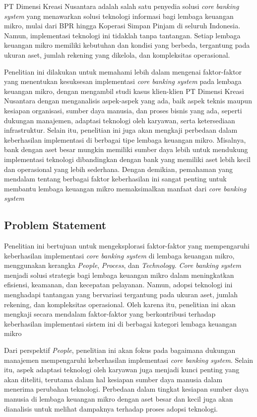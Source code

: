 \documentclass[journal,article,submit,pdftex,moreauthors]{Definitions/mdpi}
\begin{document}
PT Dimensi Kreasi Nusantara adalah salah satu penyedia solusi \textit{core banking system} yang menawarkan solusi teknologi informasi bagi lembaga keuangan mikro, mulai dari BPR hingga Koperasi Simpan Pinjam di seluruh Indonesia. Namun, implementasi teknologi ini tidaklah tanpa tantangan. Setiap lembaga keuangan mikro memiliki kebutuhan dan kondisi yang berbeda, tergantung pada ukuran aset, jumlah rekening yang dikelola, dan kompleksitas operasional.

Penelitian ini dilakukan untuk memahami lebih dalam mengenai faktor-faktor yang menentukan kesuksesan implementasi \textit{core banking system} pada lembaga keuangan mikro, dengan mengambil studi kasus klien-klien PT Dimensi Kreasi Nusantara dengan menganalisis aspek-aspek yang ada, baik aspek teknis maupun kesiapan organisasi, sumber daya manusia, dan proses bisnis yang ada, seperti dukungan manajemen, adaptasi teknologi oleh karyawan, serta ketersediaan infrastruktur. Selain itu, penelitian ini juga akan mengkaji perbedaan dalam keberhasilan implementasi di berbagai tipe lembaga keuangan mikro. Misalnya, bank dengan aset besar mungkin memiliki sumber daya lebih untuk mendukung implementasi teknologi dibandingkan dengan bank yang memiliki aset lebih kecil dan operasional yang lebih sederhana. Dengan demikian, pemahaman yang mendalam tentang berbagai faktor keberhasilan ini sangat penting untuk membantu lembaga keuangan mikro memaksimalkan manfaat dari \textit{core banking system}


\subsection{Problem Statement}

Penelitian ini bertujuan untuk mengeksplorasi faktor-faktor yang mempengaruhi keberhasilan implementasi \textit{core banking system} di lembaga keuangan mikro, menggunakan kerangka \textit{People}, \textit{Process}, dan \textit{Technology}. \textit{Core banking system} menjadi solusi strategis bagi lembaga keuangan mikro dalam meningkatkan efisiensi, keamanan, dan kecepatan pelayanan. Namun, adopsi teknologi ini menghadapi tantangan yang bervariasi tergantung pada ukuran aset, jumlah rekening, dan kompleksitas operasional. Oleh karena itu, penelitian ini akan mengkaji secara mendalam faktor-faktor yang berkontribusi terhadap keberhasilan implementasi sistem ini di berbagai kategori lembaga keuangan mikro

Dari perspektif \textit{People}, penelitian ini akan fokus pada bagaimana dukungan manajemen mempengaruhi keberhasilan implementasi \textit{core banking system}. Selain itu, aspek adaptasi teknologi oleh karyawan juga menjadi kunci penting yang akan diteliti, terutama dalam hal kesiapan sumber daya manusia dalam menerima perubahan teknologi. Perbedaan dalam tingkat kesiapan sumber daya manusia di lembaga keuangan mikro dengan aset besar dan kecil juga akan dianalisis untuk melihat dampaknya terhadap proses adopsi teknologi.
\end{document}
